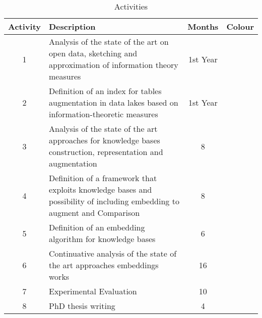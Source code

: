 \begin{table}[h!]\footnotesize
    \centering
    
    \caption{Activities\label{table1}}
    \begin{tabular}{|c|p{9cm}|c|c|}
    \hline
    \textbf{Activity} & \textbf{Description} & \textbf{Months} & \textbf{Colour}\\ \hline
    1 & Analysis of the state of the art on open data, sketching and approximation of information theory measures & 1st Year & \cellcolor{lightgreen} \\\hline
    2 & Definition of an index for tables augmentation in data lakes based on information-theoretic measures& 1st Year & \cellcolor{green} \\\hline
    3 & Analysis of the state of the art approaches for knowledge bases construction, representation and augmentation& 8 & \cellcolor{lightyellow} \\\hline
    4 & Definition of a framework that exploits knowledge bases and possibility of including embedding to augment and Comparison & 8 & \cellcolor{orange} \\\hline
    5 & Definition of an embedding algorithm for knowledge bases & 6 & \cellcolor{red} \\\hline
    6 & Continuative analysis of the state of the art approaches embeddings works & 16 & \cellcolor{cyan} \\\hline
    7 & Experimental Evaluation& 10 & \cellcolor{blue} \\\hline
    8 & PhD thesis writing& 4 & \cellcolor{blue-violet} \\\hline
    \end{tabular}
    \end{table}
    
    \bigbreak
    \vspace{-2em}
    
